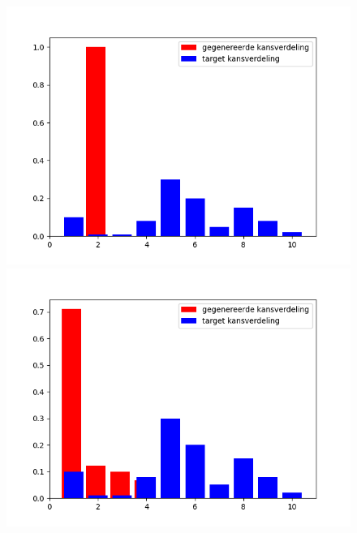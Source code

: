 \begin{figure}
    \centering
    \begin{minipage}{0.49\linewidth}
        \includegraphics[width=\linewidth]{Figures/goede_visualisatie_legende/visualisatie_0.png} 
    \end{minipage}
    \hfill
    \begin{minipage}{0.49\linewidth}
        \includegraphics[width=\linewidth]{Figures/goede_visualisatie_legende/visualisatie_90.png}
    \end{minipage}
    \begin{minipage}{0.49\linewidth}

\end{minipage}
\end{figure}
